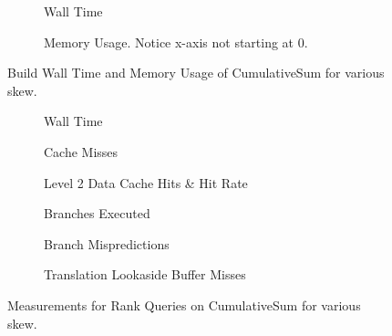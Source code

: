 \begin{figure}\tiny
\begin{subfigure}{0.48\textwidth}
	
	\caption{Wall Time}
	\label{fig:CumulativeSumSkew_n8as16_Build_WallTime}
\end{subfigure}
\hfill
\begin{subfigure}{0.48\textwidth}
	
	\caption{Memory Usage. Notice x-axis not starting at 0.}
	\label{fig:CumulativeSumSkew_n8as16_build_memory}
\end{subfigure}


\caption{Build Wall Time and Memory Usage of CumulativeSum for various skew.}
\label{fig:CumulativeSumSkew_n8as16_Build}
\end{figure}

\begin{figure}\tiny

\begin{subfigure}{0.48\textwidth}
	
	\caption{Wall Time}
	\label{fig:CumulativeSumSkew_n8as16_Rank}
\end{subfigure}
\hfill
\begin{subfigure}{0.48\textwidth}
	
	\caption{Cache Misses}
	\label{fig:CumulativeSumSkew_n8as16_Rank_CM}
\end{subfigure}

\begin{subfigure}{0.48\textwidth}
	
	\caption{Level 2 Data Cache Hits \& Hit Rate}
	\label{fig:CumulativeSumSkew_n8as16_Rank_L2CH}
\end{subfigure}
\hfill
\begin{subfigure}{0.48\textwidth}
	
	\caption{Branches Executed}
	\label{fig:CumulativeSumSkew_n8as16_Rank_BMExe}
\end{subfigure}

\begin{subfigure}{0.48\textwidth}
	
	\caption{Branch Mispredictions}
	\label{fig:CumulativeSumSkew_n8as16_Rank_BM}
\end{subfigure}
\hfill
\begin{subfigure}{0.48\textwidth}
	
	\caption{Translation Lookaside Buffer Misses}
	\label{fig:CumulativeSumSkew_n8as16_Rank_TLBM}
\end{subfigure}

\caption{Measurements for Rank Queries on CumulativeSum for various skew.}
\label{fig:CumulativeSumSkew_n8as16_Rank}
\end{figure}






